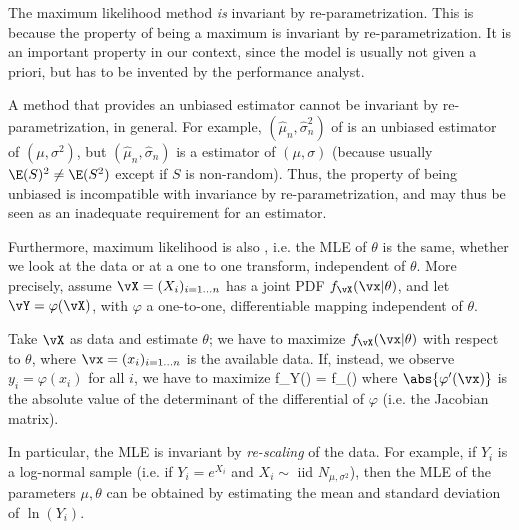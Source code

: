 The maximum likelihood method \emph{is} invariant by
re-parametrization. This is because the property of being a
maximum is invariant by re-parametrization. It is an important
property in our context, since the model is usually not given a
priori, but has to be invented by the performance analyst.

A method that provides an unbiased estimator cannot be invariant
by re-parametrization, in general. For example, $(\hat{\mu}_n,
\hat{\sigma}_n^2)$ of  is an unbiased
estimator of $(\mu, \sigma^2)$, but $(\hat{\mu}_n,
\hat{\sigma}_n)$ is a  estimator of $(\mu, \sigma)$
(because usually $\E(S)^2 \ne \E(S^2)$ except if $S$ is
non-random). Thus, the property of being unbiased is incompatible
with invariance by re-parametrization, and may thus be seen as an
inadequate requirement for an estimator.

Furthermore, maximum likelihood is also , i.e. the MLE of $\theta$ is
the same, whether we look at the data or at a one to one
transform, independent of $\theta$. More precisely, assume
$\vX=(X_i)_{i=1...n}$ has a joint PDF $f_{\vX}(\vx|\theta)$,
and let $\vY=\varphi(\vX)$, with $\varphi$ a one-to-one,
differentiable mapping independent of $\theta$.

Take $\vX$ as data and estimate $\theta$; we have to maximize
$f_{\vX}(\vx|\theta)$ with respect to $\theta$, where
$\vx=(x_i)_{i=1...n}$ is the available data. If, instead, we
observe $y_i= \varphi(x_i)$ for all $i$, we have to maximize
 \ben
 f_Y(\vy) = f_{\vX}(\vx)
 \een where $\abs{\varphi'(\vx)}$ is the absolute
 value of the determinant of the differential of
 $\varphi$ (i.e. the Jacobian matrix).

In particular, the MLE is invariant by \emph{re-scaling} of the
data. For example, if $Y_i$ is a log-normal sample (i.e. if
$Y_i=e^{X_i}$ and $X_i\sim$ iid $N_{\mu,\sigma^2}$), then the
MLE of the parameters $\mu,\theta$ can be obtained by
estimating the mean and standard deviation of $\ln(Y_i)$.


